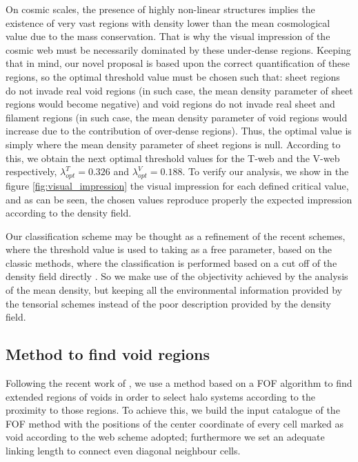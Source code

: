 \documentclass[usenatbib]{latex/mn2e}
\begin{document}
On cosmic scales, the presence of highly non-linear structures implies the 
existence of very vast regions with density lower than the mean 
cosmological value due to the mass conservation. That is why the visual 
impression of the cosmic web must be necessarily dominated by these 
under-dense regions. Keeping that in mind, our novel proposal is based upon
the correct quantification of these regions, so the optimal threshold 
value must be chosen such that: sheet regions do not invade real void 
regions (in such case, the mean density parameter of sheet regions would 
become negative) and void regions do not invade real sheet and filament 
regions (in such case, the mean density parameter of void regions would 
increase due to the contribution of over-dense regions). Thus, the optimal 
value is simply where the mean density parameter of sheet regions is 
null. According to this, we obtain the next optimal threshold values 
for the T-web and the V-web respectively, $\lambda_{opt}^T = 0.326$ and 
$\lambda_{opt}^V = 0.188$. To verify our analysis, we show in the figure 
\ref{fig:visual_impression} the visual impression for each defined critical 
value, and as can be seen, the chosen values reproduce properly the 
expected impression according to the density field. 



Our classification scheme may be thought as a refinement of the recent 
schemes, where the threshold value is used to taking as a free parameter, 
based on the classic methods, where the classification is performed 
based on a cut off of the density field directly .
So we make use of the objectivity achieved by the analysis of the mean 
density, but keeping all the environmental information provided by the
tensorial schemes instead of the poor description provided by the density 
field.



\subsection{Method to find void regions}
\label{subsec:method_voids}



Following the recent work of , we use a method 
based on a FOF algorithm to find extended regions of voids in order to
select halo systems according to the proximity to those regions. 
To achieve this, we build the input catalogue of the FOF method with the 
positions of the center coordinate of every cell marked as void according 
to the web scheme adopted; furthermore we set an adequate linking length 
to connect even diagonal neighbour cells.
\end{document}
